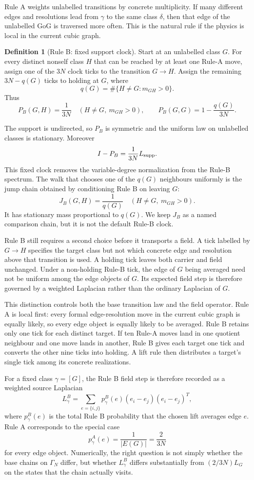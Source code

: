\documentclass[11pt]{article}
\newcommand{\G}{\Gamma}
\theoremstyle{definition}
\newtheorem{definition}[theorem]{Definition}
\begin{document}
Rule A weights unlabelled transitions by concrete multiplicity.  If many
different edges and resolutions lead from $\gamma$ to the same class $\delta$,
then that edge of the unlabelled GoG is traversed more often.  This is the
natural rule if the physics is local in the current cubic graph.

\begin{definition}[Rule B: fixed support clock]
Start at an unlabelled class $G$.  For every distinct nonself class $H$ that
can be reached by at least one Rule-A move, assign one of the $3N$ clock ticks
to the transition $G\to H$.  Assign the remaining $3N-q(G)$ ticks to holding
at $G$, where
\[
 q(G)=\#\{H\ne G:m_{GH}>0\}.
\]
Thus
\[
 P_B(G,H)=\frac1{3N}\quad(H\ne G,\ m_{GH}>0),
 \qquad
 P_B(G,G)=1-\frac{q(G)}{3N}.
\]
\end{definition}

The support is undirected, so $P_B$ is symmetric and the uniform law on
unlabelled classes is stationary.  Moreover
\[
 I-P_B=\frac1{3N}L_{\rm supp}.
\]
This fixed clock removes the variable-degree normalization from the Rule-B
spectrum.  The walk that chooses one of the $q(G)$ neighbours uniformly is the
jump chain obtained by conditioning Rule B on leaving $G$:
\[
 J_B(G,H)=\frac1{q(G)}\quad(H\ne G,\ m_{GH}>0).
\]
It has stationary mass proportional to $q(G)$.  We keep $J_B$ as a named
comparison chain, but it is not the default Rule-B clock.

Rule B still requires a second choice before it transports a field.  A tick
labelled by $G\to H$ specifies the target class but not which concrete edge and
resolution above that transition is used.  A holding tick leaves both carrier
and field unchanged.  Under a non-holding Rule-B tick, the edge of $G$ being
averaged need not be uniform among the edge objects of $G$.  Its expected field
step is therefore governed by a weighted Laplacian rather than the ordinary
Laplacian of $G$.

This distinction controls both the base transition law and the field
operator.  Rule A is local first: every formal edge-resolution move in the
current cubic graph is equally likely, so every edge object is equally likely
to be averaged.  Rule B retains only one tick for each distinct target.  If ten
Rule-A moves land in one quotient neighbour and one move lands in another,
Rule B gives each target one tick and converts the other nine ticks into
holding.  A lift rule then distributes a target's single tick among its
concrete realizations.

For a fixed class $\gamma=[G]$, the Rule B field step is therefore recorded as
a weighted source Laplacian
\[
    L_\gamma^B=\sum_{e=\{i,j\}}p_\gamma^B(e)(e_i-e_j)(e_i-e_j)^T,
\]
where $p_\gamma^B(e)$ is the total Rule B probability that the chosen lift
averages edge $e$.  Rule A corresponds to the special case
\[
    p_\gamma^A(e)=\frac{1}{|E(G)|}=\frac{2}{3N}
\]
for every edge object.  Numerically, the right question is not simply whether
the base chains on $\G_N$ differ, but whether $L_\gamma^B$ differs
substantially from $(2/3N)L_G$ on the states that the chain actually visits.
\end{document}
